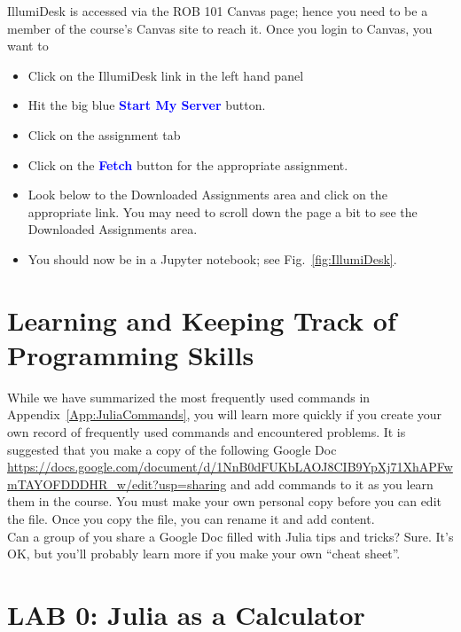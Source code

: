 IllumiDesk is accessed via the ROB 101 Canvas page; hence you need to be a member of the course's Canvas site to reach it. Once you login to Canvas, you want to 
\begin{itemize}
    \item Click on the IllumiDesk link in the left hand panel
    \item Hit the big blue \textcolor{blue}{\bf Start My Server} button.
    \item Click on the assignment tab
    \item Click on the \textcolor{blue}{\bf Fetch} button  for the appropriate assignment.
    \item Look below to the Downloaded Assignments area and click on the appropriate link. You may need to scroll down the page a bit to see the Downloaded Assignments area.
    \item You should now be in a Jupyter notebook; see Fig.~\ref{fig:IllumiDesk}.
\end{itemize}


\section{Learning and Keeping Track of Programming Skills}
\label{sec:GoogleDoc4Commands}


While we have summarized the most frequently used commands in Appendix~\ref{App:JuliaCommands}, you will learn more quickly if you create your own record of frequently used commands and encountered problems. It is suggested that you make a copy of the following Google Doc \url{https://docs.google.com/document/d/1NnB0dFUKbLAOJ8CIB9YpXj71XhAPFwmTAYOFDDDHR_w/edit?usp=sharing} and add commands to it as you learn them in the course. You must make your own personal copy before you can edit the file. Once you copy the file, you can rename it and add content.\\

Can a group of you share a Google Doc filled with Julia tips and tricks? Sure. It's OK, but you'll probably learn more if you make your own ``cheat sheet''.


\vspace*{.2cm}
\setlength{\fboxrule}{3pt}%
	\centerline{ %
}

\section{LAB 0: Julia as a Calculator}

